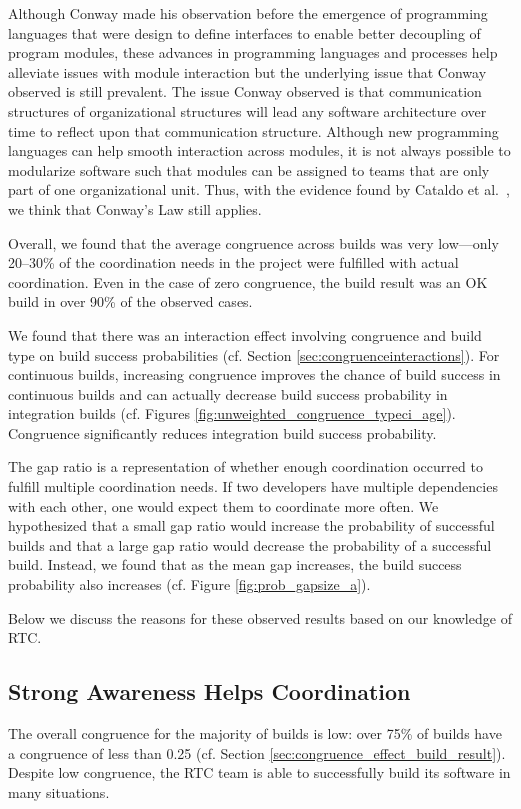 Although Conway made his observation before the emergence of programming languages that were design to define interfaces to enable better decoupling of program modules, these advances in programming languages and processes help alleviate issues with module interaction but the underlying issue that Conway observed is still prevalent.
The issue Conway observed is that communication structures of organizational structures will lead any software architecture over time to reflect upon that communication structure.
Although new programming languages can help smooth interaction across modules, it is not always possible to modularize software such that modules can be assigned to teams that are only part of one organizational unit.
Thus, with the evidence found by Cataldo et al.~\cite{cataldo:cscw:2006}, we think that Conway's Law still applies.

Overall, we found that the average congruence across builds was very low---only 20--30\% of the coordination needs in the project were fulfilled with actual coordination. Even in the case of zero congruence, the build result was an OK build in over 90\% of the observed cases.

We found that there was an interaction effect involving congruence and build type on build success probabilities (cf. Section \ref{sec:congruenceinteractions}). For continuous builds, increasing congruence improves the chance of build success in continuous builds and can actually decrease build success probability in integration builds (cf. Figures \ref{fig:unweighted_congruence_typeci_age}). Congruence significantly reduces integration build success probability.

The gap ratio is a representation of whether enough coordination
occurred to fulfill multiple coordination needs. If two developers have multiple dependencies with each other, one would expect them to
coordinate more often.
We hypothesized that a small gap ratio would increase the probability of successful builds and that a large gap ratio would decrease the probability of a successful build. Instead, we found that as the mean gap increases, the build success probability also increases (cf. Figure \ref{fig:prob_gapsize_a}).

Below we discuss the reasons for these observed results based on our knowledge of RTC.

\subsection{Strong Awareness Helps Coordination}
The overall congruence for the majority of builds is low: over 75\% of
builds have a congruence of less than 0.25 (cf. Section \ref{sec:congruence_effect_build_result}).
Despite low congruence, the RTC team is able to successfully build its software in many situations.


